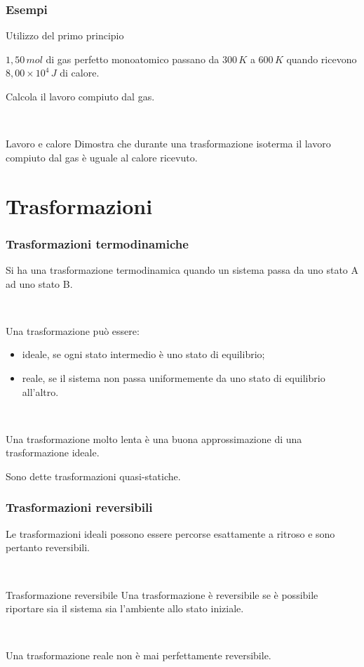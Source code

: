 \documentclass[]{beamer}
\theoremstyle{plain}
\begin{document}
\begin{frame}
\frametitle{Esempi}
\begin{exampleblock}{Utilizzo del primo principio}
{\small $ 1,50 \, mol $ di gas perfetto monoatomico passano da  $ 300 \, K $ a $ 600 \, K $ quando ricevono $ 8,00 \times 10^4 \, J $ di calore.

Calcola il lavoro compiuto dal gas.}
\end{exampleblock}

~

\begin{exampleblock}{Lavoro e calore}
{\small Dimostra che durante una trasformazione isoterma il lavoro compiuto dal gas è uguale al calore ricevuto.}
\end{exampleblock}
\end{frame}






\section{Trasformazioni}

\begin{frame}
\frametitle{Trasformazioni termodinamiche}
Si ha una trasformazione termodinamica quando un sistema passa da uno stato A ad uno stato B.

~

Una trasformazione può essere:
\begin{itemize}
  \item \alert<1>{ideale}, se ogni stato intermedio è uno stato di equilibrio;\pause
  \item \alert<2>{reale}, se il sistema non passa uniformemente da uno stato di equilibrio all'altro.\pause 
\end{itemize}

~

Una trasformazione molto lenta è una buona approssimazione di una trasformazione ideale.

Sono dette \alert{trasformazioni quasi-statiche}.
\end{frame}

\begin{frame}
\frametitle{Trasformazioni reversibili}
Le trasformazioni ideali possono essere percorse esattamente a ritroso e sono pertanto reversibili.\pause

~

\begin{block}{Trasformazione reversibile}
Una trasformazione è reversibile se è possibile riportare sia il sistema sia l'ambiente allo stato iniziale.
\end{block}\pause

~

Una trasformazione reale non è mai perfettamente reversibile.
\end{frame}
\end{document}
